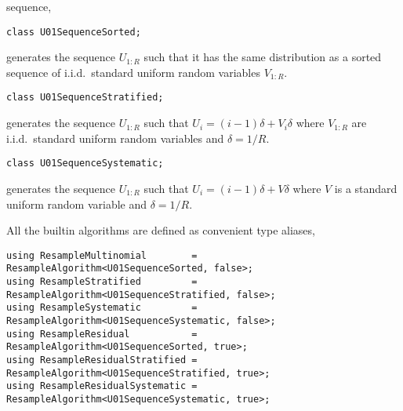 sequence,
\begin{verbatim}
class U01SequenceSorted;
\end{verbatim}
generates the sequence $U_{1:R}$ such that it has the same distribution as a
sorted sequence of i.i.d.\ standard uniform random variables $V_{1:R}$.
\begin{verbatim}
class U01SequenceStratified;
\end{verbatim}
generates the sequence $U_{1:R}$ such that $U_i = (i - 1)\delta + V_i\delta$
where $V_{1:R}$ are i.i.d.\ standard uniform random variables and $\delta = 1 /
R$.
\begin{verbatim}
class U01SequenceSystematic;
\end{verbatim}
generates the sequence $U_{1:R}$ such that $U_i = (i - 1)\delta + V\delta$
where $V$ is a standard uniform random variable and $\delta = 1 / R$.

All the builtin algorithms are defined as convenient type aliases,
\begin{verbatim}
using ResampleMultinomial        = ResampleAlgorithm<U01SequenceSorted, false>;
using ResampleStratified         = ResampleAlgorithm<U01SequenceStratified, false>;
using ResampleSystematic         = ResampleAlgorithm<U01SequenceSystematic, false>;
using ResampleResidual           = ResampleAlgorithm<U01SequenceSorted, true>;
using ResampleResidualStratified = ResampleAlgorithm<U01SequenceStratified, true>;
using ResampleResidualSystematic = ResampleAlgorithm<U01SequenceSystematic, true>;
\end{verbatim}
